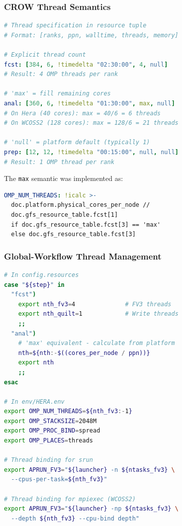 \documentclass[11pt,twoside]{article}
\newcommand{\crow}{\textsc{CROW}}
\newcommand{\gw}{\textsc{Global-Workflow}}
\begin{document}
\subsubsection{CROW Thread Semantics}

\begin{lstlisting}[language=YAML, caption={\crow{} Thread Specification}]
# Thread specification in resource tuple
# Format: [ranks, ppn, walltime, threads, memory]

# Explicit thread count
fcst: [384, 6, !timedelta "02:30:00", 4, null]
# Result: 4 OMP threads per rank

# 'max' = fill remaining cores
anal: [360, 6, !timedelta "01:30:00", max, null]  
# On Hera (40 cores): max = 40/6 = 6 threads
# On WCOSS2 (128 cores): max = 128/6 = 21 threads

# 'null' = platform default (typically 1)
prep: [12, 12, !timedelta "00:15:00", null, null]
# Result: 1 OMP thread per rank
\end{lstlisting}

The \texttt{max} semantic was implemented as:

\begin{lstlisting}[language=YAML, caption={\crow{} max Thread Calculation}]
OMP_NUM_THREADS: !icalc >-
  doc.platform.physical_cores_per_node // 
  doc.gfs_resource_table.fcst[1]
  if doc.gfs_resource_table.fcst[3] == 'max'
  else doc.gfs_resource_table.fcst[3]
\end{lstlisting}

\subsubsection{Global-Workflow Thread Management}

\begin{lstlisting}[language=Bash, caption={\gw{} Thread Configuration}]
# In config.resources
case "${step}" in
  "fcst")
    export nth_fv3=4              # FV3 threads
    export nth_quilt=1            # Write threads
    ;;
  "anal")
    # 'max' equivalent - calculate from platform
    nth=${nth:-$((cores_per_node / ppn))}
    export nth
    ;;
esac

# In env/HERA.env
export OMP_NUM_THREADS=${nth_fv3:-1}
export OMP_STACKSIZE=2048M
export OMP_PROC_BIND=spread
export OMP_PLACES=threads

# Thread binding for srun
export APRUN_FV3="${launcher} -n ${ntasks_fv3} \
  --cpus-per-task=${nth_fv3}"
  
# Thread binding for mpiexec (WCOSS2)
export APRUN_FV3="${launcher} -np ${ntasks_fv3} \
  --depth ${nth_fv3} --cpu-bind depth"
\end{lstlisting}
\end{document}
